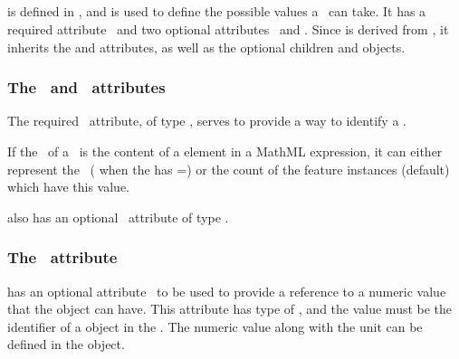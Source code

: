\subsection{}
\label{def:PossibleSpeciesFeatureValue}

 is defined in , and is used to define the possible values a \speciesFeature\ can take. It has a required attribute \idAtt\ and two optional attributes \nameAtt\ and \numericValueAtt.  Since  is derived from , it inherits the  and  attributes, as well as the optional children  and  objects. 

\subsubsection{The \idAtt\ and \nameAtt\ attributes}
\label{def:PossibleSpeciesFeatureValue:idAndName}

The required \idAtt\ attribute, of type \SIdPT, serves to provide a way to identify a \possibleSpeciesFeatureValue. 

If the \idAtt\ of a \possibleSpeciesFeatureValue\ is the content of a  element in a MathML expression, it can either represent the \numericValueAtt\ ( when the  has \representationTypeAtt=) or the count of the feature instances (default) which have this value. 


 also has an optional \nameAtt\ attribute of type \stringPT. 

\subsubsection{The \numericValueAtt\ attribute}
\label{def:PossibleSpeciesFeatureValue:numericValue}

 has an optional attribute \numericValueAtt\ to be used to provide a reference to a numeric value that the  object can have. This attribute has type of \SIdRefPT, and the value must be the identifier of a \Parameter object in the \model. The numeric value along with the unit can be defined in the \Parameter object. 

